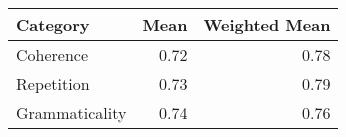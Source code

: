 \begin{tabular}{lrr}
\toprule
Category & Mean & Weighted Mean \\
\midrule
Coherence & 0.72 & 0.78 \\
Repetition & 0.73 & 0.79 \\
Grammaticality & 0.74 & 0.76 \\
\bottomrule
\end{tabular}
